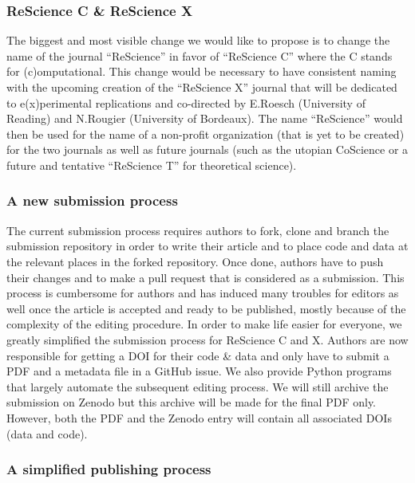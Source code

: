 
\subsubsection{ReScience C \& ReScience X}

The biggest and most visible change we would like to propose is to change the
name of the journal ``ReScience'' in favor of ``ReScience C'' where the C
stands for (c)omputational. This change would be necessary to have consistent
naming with the upcoming creation of the ``ReScience X'' journal that will be
dedicated to e(x)perimental replications and co-directed by E.Roesch
(University of Reading) and N.Rougier (University of Bordeaux). The name
``ReScience'' would then be used for the name of a non-profit organization
(that is yet to be created) for the two journals as well as future journals
(such as the utopian CoScience\supercite{Rougier:2017} or a future and
tentative ``ReScience T'' for theoretical science).


\subsubsection{A new submission process}

The current submission process requires authors to fork, clone and branch the
submission repository in order to write their article and to place code and
data at the relevant places in the forked repository. Once done, authors have
to push their changes and to make a pull request that is considered as a
submission. This process is cumbersome for authors and has induced many
troubles for editors as well once the article is accepted and ready to be
published, mostly because of the complexity of the editing procedure. In order
to make life easier for everyone, we greatly simplified the submission process
for ReScience C and X. Authors are now responsible for getting a DOI for their
code \& data and only have to submit a PDF and a metadata file in a GitHub
issue.
We also provide Python programs that largely automate the subsequent editing
process. We will still archive the submission on Zenodo but this archive will
be made for the final PDF only. However, both the PDF and the Zenodo entry will
contain all associated DOIs (data and code).


\subsubsection{A simplified publishing process}

